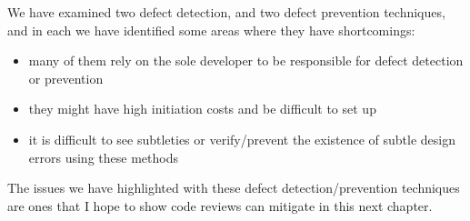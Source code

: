 We have examined two defect detection, and two defect prevention techniques, and in each we have
identified some areas where they have shortcomings:
\begin{itemize}
	\item many of them rely on the sole developer to be responsible for defect detection or prevention
	\item they might have high initiation costs and be difficult to set up
	\item it is difficult to see subtleties or verify/prevent the existence of subtle design errors
		using these methods
\end{itemize}

The issues we have highlighted with these defect detection/prevention techniques are ones that I hope
to show code reviews can mitigate in this next chapter.
